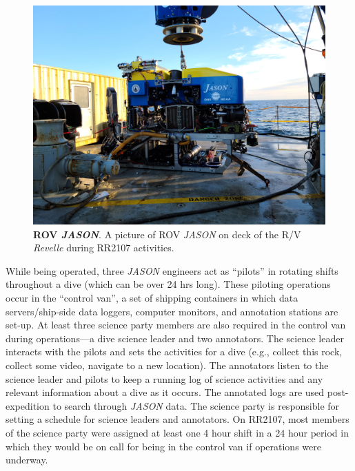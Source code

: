 \begin{figure}[h!]
  \centering
  \includegraphics[width=0.8\columnwidth]{figures/ops_jason.jpg}
  \caption[ROV \emph{JASON}]{\textbf{ROV \emph{JASON}}. A picture of ROV \emph{JASON} on deck of the R/V \emph{Revelle} during RR2107 activities.}
  \label{fig:ops_jason}
\end{figure}

While being operated, three \emph{JASON} engineers act as ``pilots'' in rotating shifts throughout a dive (which can be over 24 hrs long). These piloting operations occur in the ``control van'', a set of shipping containers in which data servers/ship-side data loggers, computer monitors, and annotation stations are set-up. At least three science party members are also required in the control van during operations---a dive science leader and two annotators. The science leader interacts with the pilots and sets the activities for a dive (e.g., collect this rock, collect some video, navigate to a new location). The annotators listen to the science leader and pilots to keep a running log of science activities and any relevant information about a dive as it occurs. The annotated logs are used post-expedition to search through \emph{JASON} data. The science party is responsible for setting a schedule for science leaders and annotators. On RR2107, most members of the science party were assigned at least one 4 hour shift in a 24 hour period in which they would be on call for being in the control van if operations were underway.


